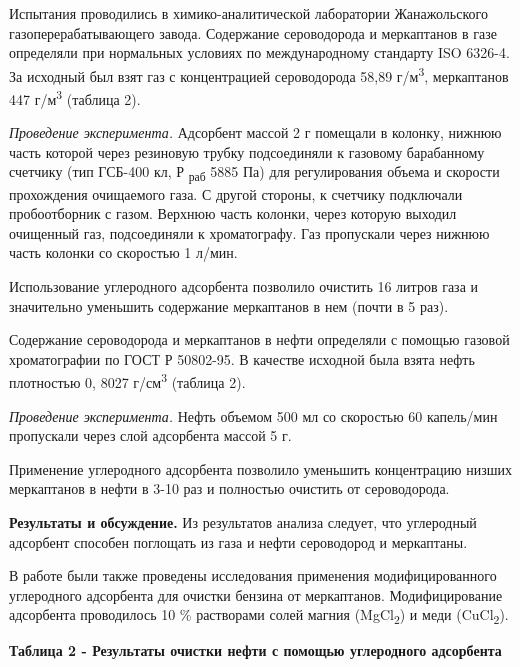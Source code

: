Испытания проводились в химико-аналитической лаборатории Жанажольского
газоперерабатывающего завода. Содержание сероводорода и меркаптанов в
газе определяли при нормальных условиях по международному стандарту ISO
6326-4. За исходный был взят газ с концентрацией сероводорода 58,89
г/м\textsuperscript{3}, меркаптанов 447 г/м\textsuperscript{3} (таблица
2).

\emph{Проведение эксперимента.} Адсорбент массой 2 г помещали в колонку,
нижнюю часть которой через резиновую трубку подсоединяли к газовому
барабанному счетчику (тип ГСБ-400 кл, Р \textsubscript{раб} 5885 Па) для
регулирования объема и скорости прохождения очищаемого газа. С другой
стороны, к счетчику подключали пробоотборник с газом. Верхнюю часть
колонки, через которую выходил очищенный газ, подсоединяли к
хроматографу. Газ пропускали через нижнюю часть колонки со скоростью 1
л/мин.

Использование углеродного адсорбента позволило очистить 16 литров газа и
значительно уменьшить содержание меркаптанов в нем (почти в 5 раз).

Содержание сероводорода и меркаптанов в нефти определяли с помощью
газовой хроматографии по ГОСТ Р 50802-95. В качестве исходной была взята
нефть плотностью 0, 8027 г/см\textsuperscript{3} (таблица 2).

\emph{Проведение эксперимента.} Нефть объемом 500 мл со скоростью 60
капель/мин пропускали через слой адсорбента массой 5 г.

Применение углеродного адсорбента позволило уменьшить концентрацию
низших меркаптанов в нефти в 3-10 раз и полностью очистить от
сероводорода.

{\bfseries Результаты и обсуждение.} Из результатов анализа следует, что
углеродный адсорбент способен поглощать из газа и нефти сероводород и
меркаптаны.

В работе были также проведены исследования применения модифицированного
углеродного адсорбента для очистки бензина от меркаптанов.
Модифицирование адсорбента проводилось 10 \% растворами солей магния
(MgCl\textsubscript{2}) и меди (CuCl\textsubscript{2}).

{\bfseries Таблица 2 - Результаты очистки нефти с помощью углеродного
адсорбента}

